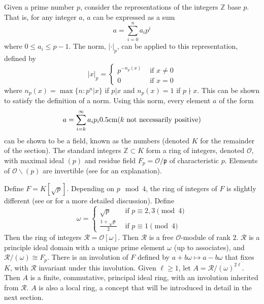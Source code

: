 Given a prime number $p$, consider the representations of the integers $\mathbb{Z}$ base $p$.
That is, for any integer $a$, $a$ can be expressed as a sum
\[
a = \sum_{i=0}^n a_i p^i
\]
where $0 \le a_i \le p - 1$.
The \padic norm, $|\cdot|_p$, can be applied to this representation, defined by
\[
|x|_p = \begin{cases}
p^{-n_p(x)} &\text{ if } x \ne 0\\
0 &\text{ if } x = 0
\end{cases}
\]
where $n_p(x) = \max \{n: p^n | x \}$ if $p | x$ and $n_p(x) = 1$ if $p \nmid x$.
This can be shown to satisfy the definition of a norm.
Using this norm, every element $a$ of the form
\[
a = \sum_{i=k}^\infty a_i p_i \hbox{0.5cm} (k \text{ not necessarily positive})
\]
can be shown to be a field, known as the \padic numbers (denoted $K$ for the remainder of the section).
The standard integers $\mathbb{Z} \subset K$ form a ring of integers, denoted $\mathcal{O}$, 
with maximal ideal $(p)$ and residue field $F_p = \mathcal{O}/\mathfrak{p}$ of characteristic $p$.
Elements of $\mathcal{O} \backslash (p)$ are invertible (see \cite{katok} for an explanation).

Define $F = K[\sqrt{p}]$.
Depending on $p \mod 4$, the ring of integers of $F$ is slightly different (see \cite{milneANT} or \cite{samuel} for a more detailed discussion).
Define
\[
\omega = \begin{cases}
\sqrt{p} &\text{ if } p \equiv 2,3 \pmod{4}\\
\frac{1 + \sqrt{p}}{2} &\text{ if } p \equiv 1 \pmod{4}
\end{cases}
\]
Then the ring of integers $\mathcal{R} = \mathcal{O}[\omega]$.
Then $\mathcal{R}$ is a free $\mathcal{O}$-module of rank $2$.
$\mathcal{R}$ is a principle ideal domain with a unique prime element $\omega$ (up to associates), and $\mathcal{R}/(\omega) \cong F_p$.
There is an involution of $F$ defined by $a + b \omega \mapsto a - b \omega$ that fixes $K$, with $\mathcal{R}$ invariant under this involution.
Given $\ell \ge 1$, let $A = \mathcal{R} / (\omega)^{2\ell}$.
Then $A$ is a finite, commutative, principal ideal ring, with an involution inherited from $\mathcal{R}$.
$A$ is also a local ring, a concept that will be introduced in detail in the next section.


